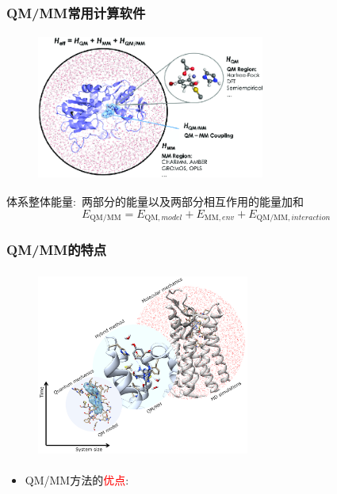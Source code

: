 \frame
{
	\frametitle{\textrm{QM/MM}常用计算软件}
\begin{figure}[h!]
\centering
\vspace{-10.5pt}
\includegraphics[height=1.90in,width=2.95in,viewport=0 0 700 450,clip]{Figures/QM-MM-treatment-of-a-biocatalytic-system.png}
\label{QM-MM-biocatalytic}
\end{figure}
体系整体能量:~两部分的能量以及两部分相互作用的能量加和
\begin{displaymath}
	E_{\mathrm{QM/MM}}=E_{\mathrm{QM},model}+E_{\mathrm{MM},env}+E_{\mathrm{QM/MM},interaction}
\end{displaymath}
{\fontsize{6.0pt}{4.2pt}}
}

\frame
{
	\frametitle{\textrm{QM/MM}的特点}
\begin{figure}[h!]
\centering
\vspace{-10.5pt}
\includegraphics[height=2.45in,width=2.75in,viewport=0 0 280 250,clip]{Figures/biomolecules-QM-MM.png}
\label{biomelecules-QM-MM}
\end{figure}
\begin{itemize}
	\item \textrm{QM/MM}方法的\textcolor{red}{优点}:~{\fontsize{8.0pt}{4.2pt}\selectfont{能处理复杂的大分子体系}}\\
		{\fontsize{6.5pt}{4.2pt}}

\end{itemize}
}

